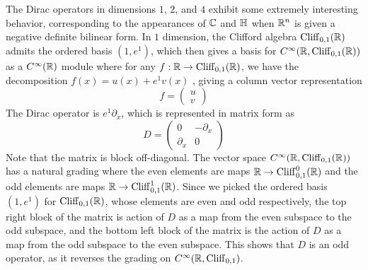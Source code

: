 The Dirac operators in dimensions $1$, $2$, and $4$ exhibit some extremely
interesting behavior, corresponding to the appearances of $\mathbb{C}$ and $\mathbb{H}$
when $\mathbb{R}^n$ is given a negative definite bilinear form. In $1$ dimension,
the Clifford algebra $\operatorname{Cliff}_{0,1}(\mathbb{R})$ admits the ordered basis $(1,e^1)$, which
then gives a basis for $C^\infty(\mathbb{R}, \operatorname{Cliff}_{0,1}(\mathbb{R}))$ as a
$C^\infty(\mathbb{R})$ module where for any $f : \mathbb{R} \to \operatorname{Cliff}_{0,1}(\mathbb{R})$, we have the
decomposition $f(x) = u(x) + e^1 v(x)$ , giving a column vector representation
\[
 f = \begin{pmatrix}
 u \\
 v
 \end{pmatrix}
\]
The Dirac operator is $e^1\partial_x$, which is represented in matrix form as
\[
 D = \begin{pmatrix}
 0 & -\partial_x \\
 \partial_x & 0
 \end{pmatrix}
\]
Note that the matrix is block off-diagonal. The vector space
$C^\infty(\mathbb{R}, \operatorname{Cliff}_{0,1}(\mathbb{R}))$ has a natural grading where the even elements
are maps $\mathbb{R} \to \operatorname{Cliff}_{0,1}^0(\mathbb{R})$ and the odd elements are maps
$\mathbb{R} \to \operatorname{Cliff}_{0,1}^1(\mathbb{R})$. Since we picked the ordered basis $(1,e^1)$
for $\operatorname{Cliff}_{0,1}(\mathbb{R})$, whose elements are even and odd respectively, the top
right block of the matrix is action of $D$ as a map from the even subspace to
the odd subspace, and the bottom left block of the matrix is the action of $D$
as a map from the odd subspace to the even subspace.
This shows that $D$ is an odd operator, as it reverses the grading on
$C^\infty(\mathbb{R}, \operatorname{Cliff}_{0,1})$. \\

